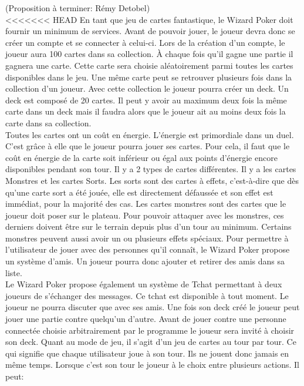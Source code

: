 \documentclass[11pt,a4paper]{article}
\begin{document}
(Proposition à terminer: Rémy Detobel)\\
<<<<<<< HEAD
En tant que jeu de cartes fantastique, le Wizard Poker doit fournir un minimum de services. Avant de pouvoir jouer, le joueur devra donc se créer un compte et se connecter à celui-ci.  Lors de la création d'un compte, le joueur aura 100 cartes dans sa \gls{collection}.  À chaque fois qu'il gagne une partie il gagnera une carte.  Cette carte sera choisie aléatoirement parmi toutes les cartes disponibles dans le jeu.  Une même carte peut se retrouver plusieurs fois dans la \gls{collection} d'un joueur.  Avec cette \gls{collection} le joueur pourra créer un \gls{deck}.  Un \gls{deck} est composé de 20 cartes.  Il peut y avoir au maximum deux fois la même carte dans un \gls{deck} mais il faudra alors que le joueur ait au moins deux fois la carte dans sa \gls{collection}.\\
Toutes les cartes ont un coût en énergie. L'énergie est primordiale dans un duel. C'est grâce à elle que le joueur pourra jouer ses cartes. Pour cela, il faut que le coût en énergie de la carte soit inférieur ou égal aux points d'énergie encore disponibles pendant son tour.
Il y a 2 types de cartes différentes. Il y a les cartes Monstres et les cartes Sorts. Les sorts sont des cartes à effets, c'est-à-dire que dès qu'une carte sort a été jouée, elle est directement défaussée et son effet est immédiat, pour la majorité des cas.
Les cartes monstres sont des cartes que le joueur doit poser sur le plateau. Pour pouvoir attaquer avec les monstres, ces derniers doivent être sur le terrain depuis plus d'un tour au minimum. Certains monstres peuvent aussi avoir un ou plusieurs effets spéciaux.
Pour permettre à l'utilisateur de jouer avec des personnes qu'il connaît, le Wizard Poker propose un système d'amis.  Un joueur pourra donc ajouter et retirer des amis dans sa liste.\\
Le Wizard Poker propose également un système de Tchat permettant à deux joueurs de s'échanger des messages.  Ce tchat est disponible à tout moment.  Le joueur ne pourra discuter que avec ses amis.
Une fois son \gls{deck} créé le joueur peut jouer une partie contre quelqu'un d'autre.  Avant de jouer contre une personne connectée choisie arbitrairement par le programme le joueur sera invité à choisir son \gls{deck}. Quant au mode de jeu, il s'agit d'un jeu de cartes au tour par tour.  Ce qui signifie que chaque utilisateur joue à son tour.  Ils ne jouent donc jamais en même temps.  Lorsque c'est son tour le joueur à le choix entre plusieurs actions. Il peut:
\end{document}
